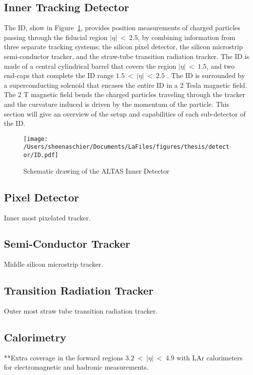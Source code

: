 \subsection{Inner Tracking Detector}
The ID, show in Figure~\ref{fig:ID}, provides position measurements of charged particles passing through the fiducial region $|\eta|~<~2.5$, by combining information from three separate tracking systems; the silicon pixel detector, the silicon microstrip semi-conductor tracker, and the straw-tube transition radiation tracker.  The ID is made of a central cylindrical barrel that covers the region $|\eta|~<~1.5$, and two end-caps that complete the ID range $1.5~<~|\eta|~<~2.5$ . The ID is surrounded by a superconducting solenoid that encases the entire ID in a 2 Tesla magnetic field.  The 2 T magnetic field bends the charged particles traveling through the tracker and the curvature induced is driven by the momentum of the particle. This section will give an overview of the setup and capabilities of each sub-detector of the ID.  

  \begin{figure}[tbp]
 \texttt{[image: /Users/sheenaschier/Documents/LaFiles/figures/thesis/detector/ID.pdf]}
    \caption{Schematic drawing of the ALTAS Inner Detector}
   \label{fig:ID}
 \end{figure}
\subsection{Pixel Detector}
Inner most pixelated tracker.
\subsection{Semi-Conductor Tracker}
Middle silicon microstrip tracker.
\subsection{Transition Radiation Tracker}
Outer most straw tube transition radiation tracker.


\subsection{Calorimetry}
**Extra coverage in the forward regions $3.2~<~|\eta|~<~4.9$ with LAr calorimeters for electromagnetic and hadronic measurements.
